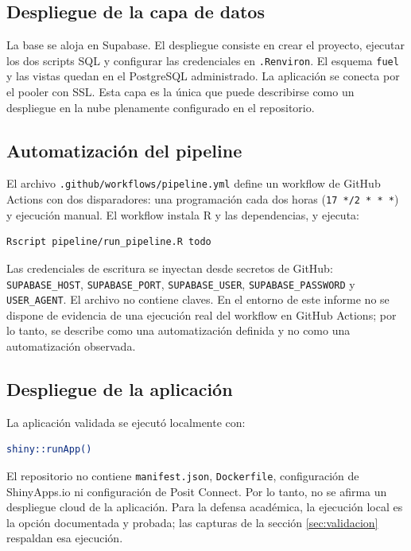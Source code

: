 \documentclass[12pt,a4paper]{article}
\newcommand{\fuel}{\texttt{fuel}}
\newcommand{\archivo}[1]{\texttt{#1}}
\begin{document}
\subsection{Despliegue de la capa de datos}

La base se aloja en Supabase. El despliegue consiste en crear el proyecto, ejecutar los dos scripts SQL y configurar las credenciales en \texttt{.Renviron}. El esquema \fuel{} y las vistas quedan en el PostgreSQL administrado. La aplicación se conecta por el pooler con SSL. Esta capa es la única que puede describirse como un despliegue en la nube plenamente configurado en el repositorio.

\subsection{Automatización del pipeline}

El archivo \archivo{.github/workflows/pipeline.yml} define un workflow de GitHub Actions con dos disparadores: una programación cada dos horas (\texttt{17 */2 * * *}) y ejecución manual. El workflow instala R y las dependencias, y ejecuta:

\begin{lstlisting}[language=bash,caption={Comando de captura del workflow.}]
Rscript pipeline/run_pipeline.R todo
\end{lstlisting}

Las credenciales de escritura se inyectan desde secretos de GitHub: \texttt{SUPABASE\_HOST}, \texttt{SUPABASE\_PORT}, \texttt{SUPABASE\_USER}, \texttt{SUPABASE\_PASSWORD} y \texttt{USER\_AGENT}. El archivo no contiene claves. En el entorno de este informe no se dispone de evidencia de una ejecución real del workflow en GitHub Actions; por lo tanto, se describe como una automatización definida y no como una automatización observada.

\subsection{Despliegue de la aplicación}

La aplicación validada se ejecutó localmente con:

\begin{lstlisting}[language=bash,caption={Ejecucion local del tablero.}]
shiny::runApp()
\end{lstlisting}

El repositorio no contiene \texttt{manifest.json}, \texttt{Dockerfile}, configuración de ShinyApps.io ni configuración de Posit Connect. Por lo tanto, no se afirma un despliegue cloud de la aplicación. Para la defensa académica, la ejecución local es la opción documentada y probada; las capturas de la sección \ref{sec:validacion} respaldan esa ejecución.
\end{document}
